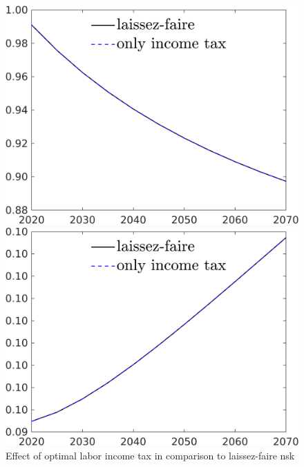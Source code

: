 \begin{figure}[h!!]
	\centering
	\caption{Effect of optimal labor income tax in comparison to laissez-faire nsk }\label{fig:LF_vs_onlytaul_nsk}
	\begin{minipage}[]{0.32\textwidth}
		\includegraphics[width=1\textwidth]{../../codding_model/own_basedOnFried/optimalPol_190722_tidiedUp/figures/all_10Aout22/CountTaul_modnsk_target_S_spillover0_sep1_extern0_PV1_etaa0.79_lgd1.png}
	\end{minipage}
	\begin{minipage}[]{0.32\textwidth}
		\includegraphics[width=1\textwidth]{../../codding_model/own_basedOnFried/optimalPol_190722_tidiedUp/figures/all_10Aout22/CountTaul_modnsk_target_sff_spillover0_sep1_extern0_PV1_etaa0.79_lgd1.png}

\end{minipage}
\end{figure}
